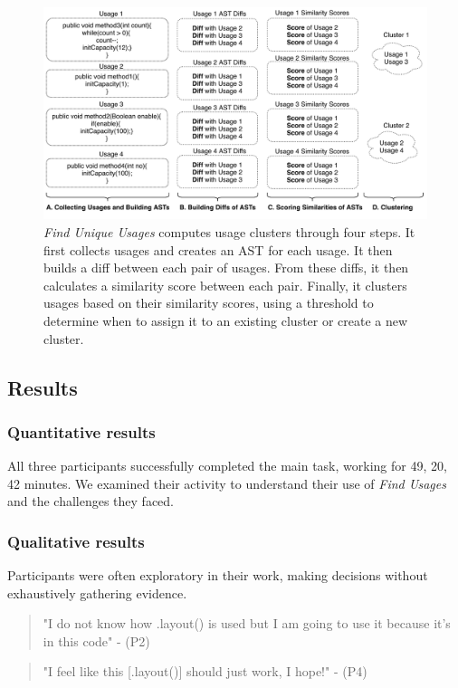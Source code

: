 \documentclass[conference]{IEEEtran}
\begin{document}
\begin{figure}
    \centering
    \includegraphics [width=\textwidth,keepaspectratio,clip]{figures/GeneralView2.pdf}
    \caption{\textit{Find Unique Usages} computes usage clusters through four steps. It first collects usages and creates an AST for each usage. It then builds a diff between each pair of usages. From these diffs, it then calculates a similarity score between each pair. Finally, it clusters usages based on their similarity scores, using a threshold to determine when to assign it to an existing cluster or create a new cluster.}
\label{fig:generalview}
\end{figure}

\subsection{Results}

\subsubsection{Quantitative results}All three participants successfully completed the main task, working for 49, 20, 42 minutes. We examined their activity to understand their use of \textit{Find Usages} and the challenges they faced. 

\subsubsection{Qualitative results}Participants were often exploratory in their work, making decisions without exhaustively gathering evidence. 
\begin{quote}"I do not know how .layout() is used but I am going to use it because it's in this code" - (P2) \end{quote}
\begin{quote}"I feel like this [.layout()] should just work, I hope!" - (P4) \end{quote}
\end{document}

